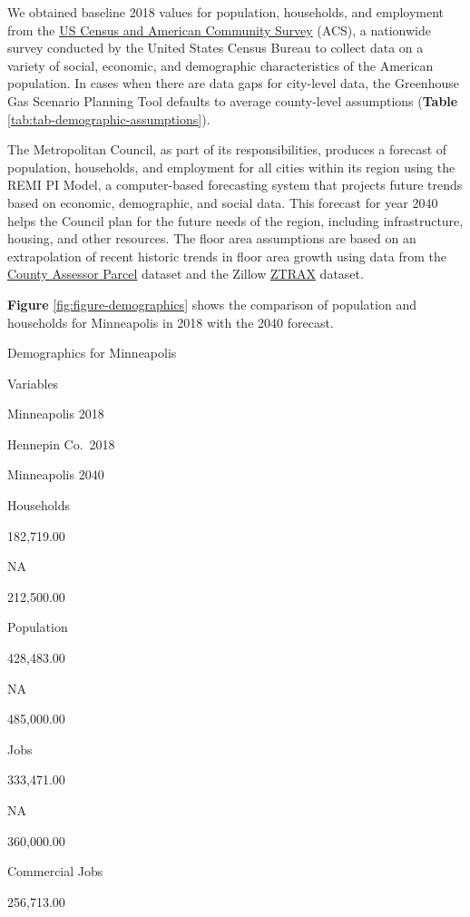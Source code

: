 \documentclass[
]{book}
\begin{document}
We obtained baseline 2018 values for population, households, and employment from the \href{https://www.census.gov/programs-surveys/acs}{US Census and American Community Survey} (ACS), a nationwide survey conducted by the United States Census Bureau to collect data on a variety of social, economic, and demographic characteristics of the American population. In cases when there are data gaps for city-level data, the Greenhouse Gas Scenario Planning Tool defaults to average county-level assumptions (\textbf{Table} \ref{tab:tab-demographic-assumptions}).

The Metropolitan Council, as part of its responsibilities, produces a forecast of population, households, and employment for all cities within its region using the REMI PI Model, a computer-based forecasting system that projects future trends based on economic, demographic, and social data. This forecast for year 2040 helps the Council plan for the future needs of the region, including infrastructure, housing, and other resources. The floor area assumptions are based on an extrapolation of recent historic trends in floor area growth using data from the \href{https://www.hennepin.us/residents/property/property-information-search}{County Assessor Parcel} dataset and the Zillow \href{https://www.zillow.com/research/ztrax/}{ZTRAX} dataset.

\textbf{Figure} \ref{fig:figure-demographics} shows the comparison of population and households for Minneapolis in 2018 with the 2040 forecast.

\label{tab:tab-demographic-assumptions}Demographics for Minneapolis

Variables

Minneapolis 2018

Hennepin Co.~2018

Minneapolis 2040

Households

182,719.00

NA

212,500.00

Population

428,483.00

NA

485,000.00

Jobs

333,471.00

NA

360,000.00

Commercial Jobs

256,713.00
\end{document}
